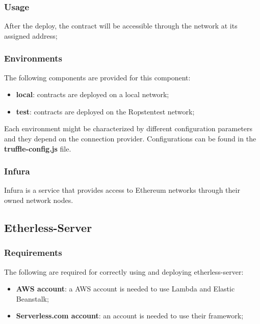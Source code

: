 \subsubsection{Usage}
After the deploy, the contract will be accessible through the network at its assigned address;
\subsubsection{Environments}
The following components are provided for this component:
\begin{itemize}
	\item \textbf{local}: contracts are deployed on a local network;
	\item \textbf{test}: contracts are deployed on the Ropsten\glo test network;
\end{itemize}
Each environment might be characterized by different configuration parameters and they depend on the connection provider. Configurations can be found in the \textbf{truffle-config.js} file.
\subsubsection{Infura}
Infura is a service that provides access to Ethereum networks through their owned network nodes.
\subsection{Etherless-Server}
\subsubsection{Requirements}
The following are required for correctly using and deploying etherless-server:
\begin{itemize}
	\item \textbf{AWS account}: a AWS account is needed to use Lambda and Elastic Beanstalk;
	\item \textbf{Serverless.com account}: an account is needed to use their framework;
\end{itemize}
